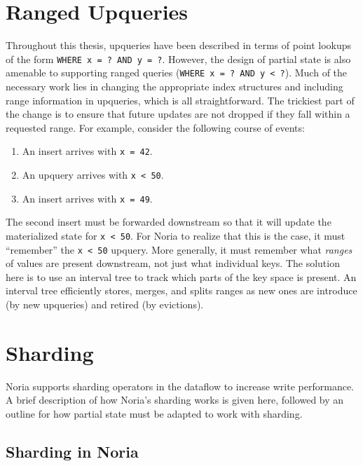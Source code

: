 \section{Ranged Upqueries}
\label{s:disc:ranged}

Throughout this thesis, upqueries have been described in terms of point lookups
of the form \texttt{WHERE x = ? AND y = ?}. However, the design of partial state
is also amenable to supporting ranged queries (\texttt{WHERE x = ? AND y < ?}).
Much of the necessary work lies in changing the appropriate index structures and
including range information in upqueries, which is all straightforward. The
trickiest part of the change is to ensure that future updates are not dropped if
they fall within a requested range. For example, consider the following course
of events:

\begin{enumerate}
  \item An insert arrives with \texttt{x = 42}.
  \item An upquery arrives with \texttt{x < 50}.
  \item An insert arrives with \texttt{x = 49}.
\end{enumerate}

The second insert must be forwarded downstream so that it will update the
materialized state for \texttt{x < 50}. For Noria to realize that this is the
case, it must ``remember'' the \texttt{x < 50} upquery. More generally, it must
remember what \emph{ranges} of values are present downstream, not just what
individual keys. The solution here is to use an interval tree to track which
parts of the key space is present. An interval tree efficiently stores, merges,
and splits ranges as new ones are introduce (by new upqueries) and retired (by
evictions).

\section{Sharding}

Noria supports sharding operators in the dataflow to increase write performance.
A brief description of how Noria's sharding works is given here, followed by an
outline for how partial state must be adapted to work with sharding.

\subsection{Sharding in Noria}

